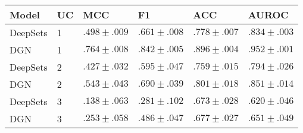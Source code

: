 \begin{tabular}{llllll}
\toprule
Model & UC & \textbf{MCC} & \textbf{F1} & \textbf{ACC} & \textbf{AUROC} \\
\midrule
DeepSets & 1 & $.498\scriptstyle \pm .009$ & $.661\scriptstyle \pm .008$ & $.778\scriptstyle \pm .007$ & $.834\scriptstyle \pm .003$ \\
DGN & 1 & $\mathbf{.764\scriptstyle \pm .008}$ & $\mathbf{.842\scriptstyle \pm .005}$ & $\mathbf{.896\scriptstyle \pm .004}$ & $\mathbf{.952\scriptstyle \pm .001}$ \\
DeepSets & 2 & $.427\scriptstyle \pm .032$ & $.595\scriptstyle \pm .047$ & $.759\scriptstyle \pm .015$ & $.794\scriptstyle \pm .026$ \\
DGN & 2 & $.543\scriptstyle \pm .043$ & $.690\scriptstyle \pm .039$ & $.801\scriptstyle \pm .018$ & $.851\scriptstyle \pm .014$ \\
DeepSets & 3 & $.138\scriptstyle \pm .063$ & $.281\scriptstyle \pm .102$ & $.673\scriptstyle \pm .028$ & $.620\scriptstyle \pm .046$ \\
DGN & 3 & $.253\scriptstyle \pm .058$ & $.486\scriptstyle \pm .047$ & $.677\scriptstyle \pm .027$ & $.651\scriptstyle \pm .049$ \\
\bottomrule
\end{tabular}
